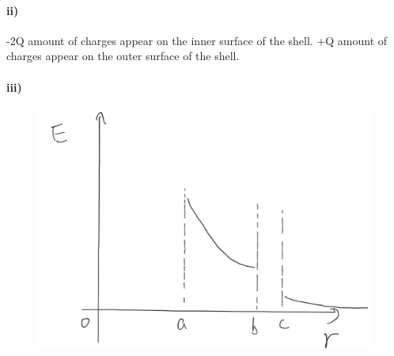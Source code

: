 \documentclass[../homework.tex]{subfiles}
\begin{document}
\paragraph{ii)}
\begin{subp}

	-2Q amount of charges appear on the inner surface of the shell. +Q amount of charges appear on the outer surface of the shell.
\end{subp}

\paragraph{iii)}
\begin{subp}
	\begin{figure}[H]
		\includegraphics[width=.6\linewidth]{p2-b-sketch.png}
	\end{figure}
\end{subp}
\end{document}

